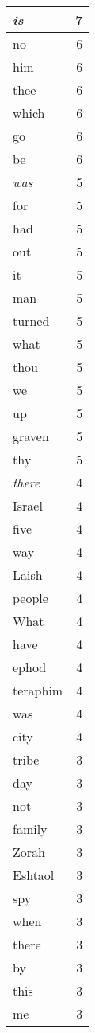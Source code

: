 \begin{center}
\begin{longtable}{l|r}
\emph{is} & 7\\ \hline 
no & 6\\ \hline 
him & 6\\ \hline 
thee & 6\\ \hline 
which & 6\\ \hline 
go & 6\\ \hline 
be & 6\\ \hline 
\emph{was} & 5\\ \hline 
for & 5\\ \hline 
had & 5\\ \hline 
out & 5\\ \hline 
it & 5\\ \hline 
man & 5\\ \hline 
turned & 5\\ \hline 
what & 5\\ \hline 
thou & 5\\ \hline 
we & 5\\ \hline 
up & 5\\ \hline 
graven & 5\\ \hline 
thy & 5\\ \hline 
\emph{there} & 4\\ \hline 
Israel & 4\\ \hline 
five & 4\\ \hline 
way & 4\\ \hline 
Laish & 4\\ \hline 
people & 4\\ \hline 
What & 4\\ \hline 
have & 4\\ \hline 
ephod & 4\\ \hline 
teraphim & 4\\ \hline 
was & 4\\ \hline 
city & 4\\ \hline 
tribe & 3\\ \hline 
day & 3\\ \hline 
not & 3\\ \hline 
family & 3\\ \hline 
Zorah & 3\\ \hline 
Eshtaol & 3\\ \hline 
spy & 3\\ \hline 
when & 3\\ \hline 
there & 3\\ \hline 
by & 3\\ \hline 
this & 3\\ \hline 
me & 3\\ \hline 

\end{longtable}
\end{center}
